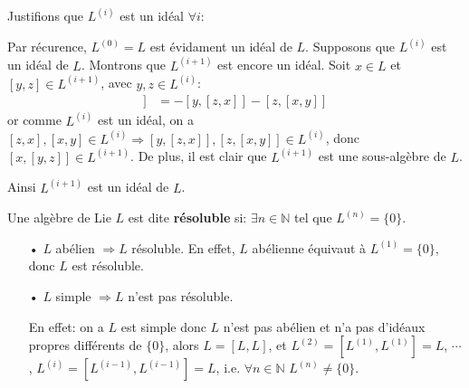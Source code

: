 \documentclass[a4paper,openany,12pt]{report}
\newcommand{\NN}{\mathbb{N}}
\theoremstyle{break}
{\theorembodyfont{\upshape}
\newtheorem*{rmq}{Remarque :}
\newtheorem*{prv}{Preuve :}
\newtheorem*{ex}{Exemples :}
\newtheorem*{exe}{Exemple : }
\newtheorem*{nota}{Notation :}
\newtheorem*{dem}{D\'emonstration :}}
\begin{document}
Justifions que $L^{(i)}$ est un idéal $\forall i$:

\quad Par récurence, $L^{(0)} = L$ est évidament un idéal de $L$. Supposons que $L^{(i)}$ est un idéal de $L$. Montrons que $L^{(i+1)}$ est encore un idéal. Soit $x \in L$ et $[y,z] \in L^{(i+1)}$, avec $y,z \in L^{(i)}$:
\begin{align*}
[x,[y,z]] & = -[y,[z,x]]-[z,[x,y]]
\end{align*}
or comme $L^{(i)}$ est un idéal, on a $[z,x],[x,y] \in L^{(i)} \Rightarrow [y,[z,x]],[z,[x,y]] \in L^{(i)}$, donc $[x,[y,z]] \in L^{(i+1)}$. De plus, il est clair que $L^{(i+1)}$ est une sous-algèbre de $L$.

Ainsi $L^{(i+1)}$ est un idéal de $L$. 

\begin{df}
\quad Une algèbre de Lie $L$ est dite \textbf{résoluble} si: $\exists n \in \NN $ tel que $L^{(n)} = \{0\}$.
\end{df}

\begin{rmq}
\begin{itemize}
\item[•]  $L$ abélien $\Rightarrow L$ résoluble. En effet, $L$ abélienne équivaut à $L^{(1)} = \{0\}$, donc $L$ est résoluble.

\item[•]  $L$ simple $\Rightarrow L$ n'est pas résoluble.

En effet: on a  $L$ est simple donc $L$ n'est pas  abélien et n'a pas d'idéaux propres différents de $\{0\}$, alors $L = [L,L]$, et $L^{(2)} = [L^{(1)},L^{(1)}] = L$, $\cdots$ , $L^{(i)} = [L^{(i-1)},L^{(i-1)}]=L $, i.e. $\forall n \in \NN $  $L^{(n)}\ne \{0\}$.
\end{itemize}
\end{rmq}
\end{document}
